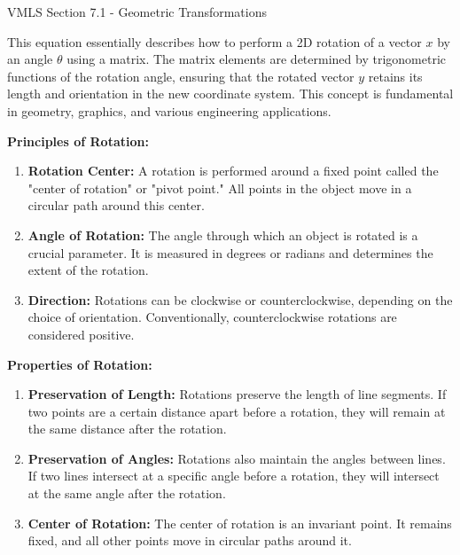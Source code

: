 \begin{notes}{VMLS Section 7.1 - Geometric Transformations}
\begin{highlight}
        This equation essentially describes how to perform a 2D rotation of a vector \(x\) by an angle \(\theta\) using a matrix. The matrix elements are determined by trigonometric functions of the rotation 
        angle, ensuring that the rotated vector \(y\) retains its length and orientation in the new coordinate system. This concept is fundamental in geometry, graphics, and various engineering applications.
    \end{highlight}

    \textbf{Principles of Rotation:}

    \begin{enumerate}
        \item \textbf{Rotation Center:} A rotation is performed around a fixed point called the "center of rotation" or "pivot point." All points in the object move in a circular path around this center.
        
        \item \textbf{Angle of Rotation:} The angle through which an object is rotated is a crucial parameter. It is measured in degrees or radians and determines the extent of the rotation.
        
        \item \textbf{Direction:} Rotations can be clockwise or counterclockwise, depending on the choice of orientation. Conventionally, counterclockwise rotations are considered positive.
    \end{enumerate}

    \textbf{Properties of Rotation:}

    \begin{enumerate}
        \item \textbf{Preservation of Length:} Rotations preserve the length of line segments. If two points are a certain distance apart before a rotation, they will remain at the same distance after 
        the rotation.
        
        \item \textbf{Preservation of Angles:} Rotations also maintain the angles between lines. If two lines intersect at a specific angle before a rotation, they will intersect at the same angle after 
        the rotation.
        
        \item \textbf{Center of Rotation:} The center of rotation is an invariant point. It remains fixed, and all other points move in circular paths around it.
    \end{enumerate}


\end{notes}
